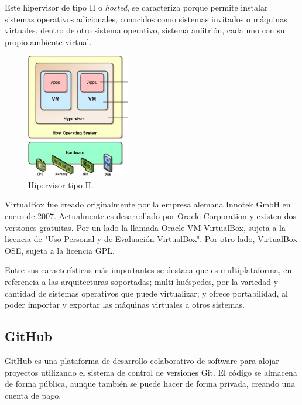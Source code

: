 Este hipervisor de tipo II o \textit{hosted}, se caracteriza porque permite instalar sistemas operativos adicionales, conocidos como sistemas invitados o máquinas virtuales, dentro de otro sistema operativo, sistema anfitrión, cada uno con su propio ambiente virtual.

\begin{figure}[H]
\centering
\includegraphics[width=0.4\textwidth]{images/figures/hypervisortype2.jpg}
\caption{Hipervisor tipo II.\label{fig:figure_placement_example}}
\end{figure}

VirtualBox fue creado originalmente por la empresa alemana Innotek GmbH en enero de 2007. Actualmente es desarrollado por Oracle Corporation y existen dos versiones gratuitas. Por un lado la llamada Oracle VM VirtualBox, sujeta a la licencia de "Uso Personal y de Evaluación VirtualBox". Por otro lado, VirtualBox OSE, sujeta a la licencia GPL.

Entre sus características más importantes se destaca que es multiplataforma, en referencia a las arquitecturas soportadas; multi huéspedes, por la variedad y cantidad de sistemas operativos que puede virtualizar; y ofrece portabilidad, al poder importar y exportar las máquinas virtuales a otros sistemas.

\subsection{GitHub}

GitHub es una plataforma de desarrollo colaborativo de software para alojar proyectos utilizando el sistema de control de versiones Git. El código se almacena de forma pública, aunque también se puede hacer de forma privada, creando una cuenta de pago.

